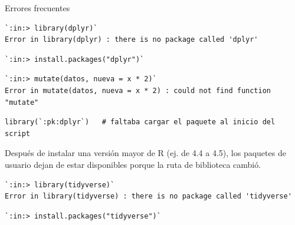 \documentclass[8pt]{beamer}
\begin{document}
	\begin{frame}[fragile]{Errores frecuentes}
\begin{lstlisting}[style=RConsole]
`:in:> library(dplyr)`
Error in library(dplyr) : there is no package called 'dplyr'
\end{lstlisting}
\begin{lstlisting}[style=RConsole]
`:in:> install.packages("dplyr")`
\end{lstlisting}

\begin{lstlisting}[style=RConsole]
`:in:> mutate(datos, nueva = x * 2)`
Error in mutate(datos, nueva = x * 2) : could not find function "mutate"
\end{lstlisting}
\begin{lstlisting}[style=RScript]
library(`:pk:dplyr`)   # faltaba cargar el paquete al inicio del script
\end{lstlisting}

		Después de instalar una versión mayor de R (ej. de 4.4 a 4.5), los paquetes de usuario dejan de estar disponibles porque la ruta de biblioteca cambió.
\begin{lstlisting}[style=RConsole]
`:in:> library(tidyverse)`
Error in library(tidyverse) : there is no package called 'tidyverse'
\end{lstlisting}
\begin{lstlisting}[style=RConsole]
`:in:> install.packages("tidyverse")`
\end{lstlisting}
	\end{frame}
\end{document}

